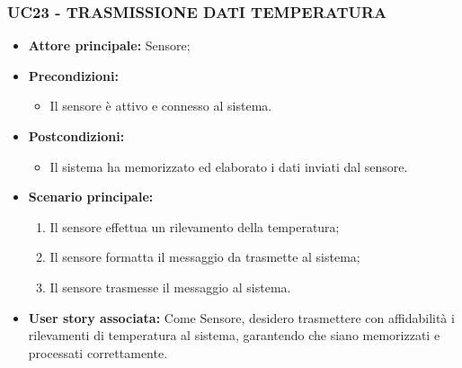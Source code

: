 \subsubsection{UC23 - TRASMISSIONE DATI TEMPERATURA}
\begin{itemize}
    \item \textbf{Attore principale:} Sensore;
    \item \textbf{Precondizioni:}
        \begin{itemize}
            \item Il sensore è attivo e connesso al sistema. 
        \end{itemize}
    \item \textbf{Postcondizioni:}
        \begin{itemize}
            \item Il sistema ha memorizzato ed elaborato i dati inviati dal sensore.
        \end{itemize}
    \item \textbf{Scenario principale:}
        \begin{enumerate}
            \item Il sensore effettua un rilevamento della temperatura;
            \item Il sensore formatta il messaggio da trasmette al sistema;
            \item Il sensore trasmesse il messaggio al sistema.
        \end{enumerate}
    \item \textbf{User story associata:}
    Come Sensore, desidero trasmettere con affidabilità i rilevamenti di temperatura al sistema, garantendo che siano memorizzati e processati correttamente.
\end{itemize}
